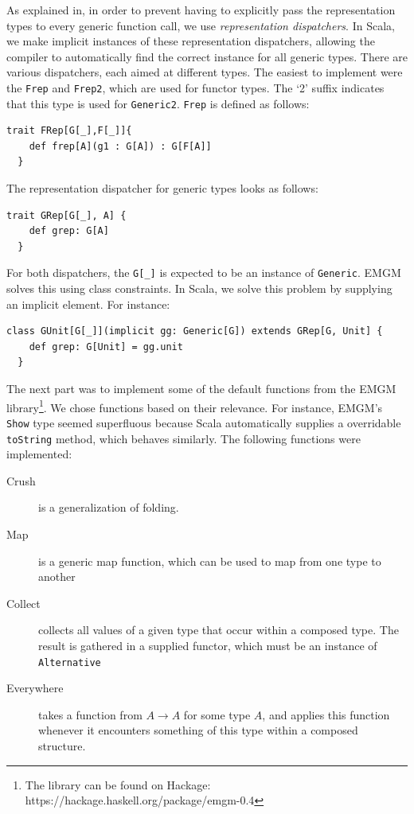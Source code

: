 \documentclass[a4paper]{article}
\begin{document}
As explained in\cite{emgm}, in order to prevent having to explicitly pass the representation types to every generic function call, we use \emph{representation dispatchers}. In Scala, we make implicit instances of these representation dispatchers, allowing the compiler to automatically find the correct instance for all generic types. There are various dispatchers, each aimed at different types. The easiest to implement were the \texttt{Frep} and \texttt{Frep2}, which are used for functor types. The `2' suffix indicates that this type is used for \texttt{Generic2}. \texttt{Frep} is defined as follows:

\begin{lstlisting}[style=scala]
 trait FRep[G[_],F[_]]{
    def frep[A](g1 : G[A]) : G[F[A]]
  }
  \end{lstlisting}

The representation dispatcher for generic types looks as follows:
 
 \begin{lstlisting}[style=scala]
  trait GRep[G[_], A] {
    def grep: G[A]
  }
   \end{lstlisting}
   
For both dispatchers, the \texttt{G[\_]} is expected to be an instance of \texttt{Generic}. EMGM solves this using class constraints. In Scala, we solve this problem by supplying an implicit element. For instance:

\begin{lstlisting}[style=scala]
  class GUnit[G[_]](implicit gg: Generic[G]) extends GRep[G, Unit] {
    def grep: G[Unit] = gg.unit
  }
\end{lstlisting}

The next part was to implement some of  the default functions from the EMGM library\footnote{The library can be found on Hackage: https://hackage.haskell.org/package/emgm-0.4}. We chose functions based on their relevance. For instance, EMGM's \texttt{Show} type seemed superfluous because Scala automatically supplies a overridable \texttt{toString} method, which behaves similarly. The following functions were implemented:
\begin{description}
	\item[Crush] is a generalization of folding.
    \item[Map] is a generic map function, which can be used to map from one type to another
    \item[Collect] collects all values of a given type that occur within a composed type. The result is gathered in a supplied functor, which must be an instance of \texttt{Alternative}
    \item[Everywhere] takes a function from $A \rightarrow A$ for some type $A$, and applies this function whenever it encounters something of this type within a composed structure.
\end{description}
\end{document}
